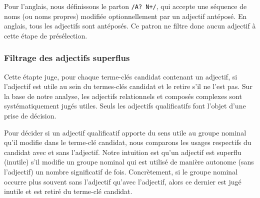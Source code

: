         Pour l'anglais, nous définissons le parton \texttt{/A? N+/}, qui accepte
        une séquence de noms (ou noms propres) modifiée optionnellement par un
        adjectif antéposé. En anglais, tous les adjectifs sont antéposés. Ce
        patron ne filtre donc aucun adjectif à cette étape de présélection.

      \subsubsection{Filtrage des adjectifs superflus}
      \label{subsubsec:main:domain_independent_keyphrase_extraction-keyphrase_candidate_selection-modifiers_filtering-adjective_filtering}
        Cette étapte juge, pour chaque terme-clés candidat contenant un
        adjectif, si l'adjectif est utile au sein du termes-clés candidat et le
        retire s'il ne l'est pas. Sur la base de notre analyse, les adjectifs
        relationnels et composés complexes sont systématiquement jugés utiles.
        Seuls les adjectifs qualificatifs font l'objet d'une prise de décision.

        Pour décider si un adjectif qualificatif apporte du sens utile au groupe
        nominal qu'il modifie dans le terme-clé candidat, nous comparons les
        usages respectifs du candidat avec et sans l'adjectif. Notre intuition
        est qu'un adjectif est superflu (inutile) s'il modifie un groupe nominal
        qui est utilisé de manière autonome (sans l'adjectif) un nombre
        significatif de fois. Concrètement, si le groupe nominal occurre plus
        souvent sans l'adjectif qu'avec l'adjectif, alors ce dernier est jugé
        inutile et est retiré du terme-clé candidat.

